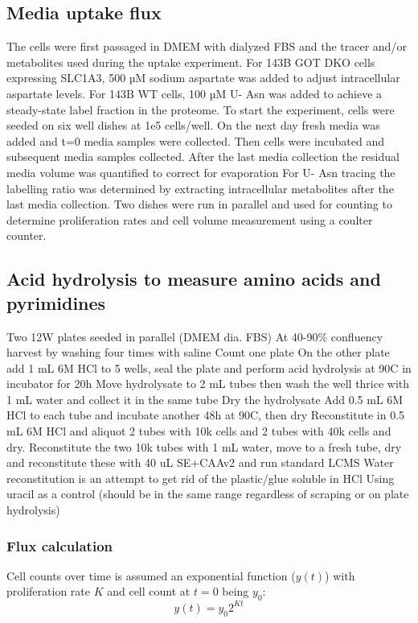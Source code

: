 \subsection{Media uptake flux}
The cells were first passaged in DMEM with dialyzed FBS and the tracer and/or metabolites used during the uptake experiment.
For 143B GOT DKO cells expressing SLC1A3, 500 µM sodium aspartate was added to adjust intracellular aspartate levels.
For 143B WT cells, 100 µM U-\hCi{} Asn was added to achieve a steady-state label fraction in the proteome.
To start the experiment, cells were seeded on six well dishes at 1e5 cells/well.
On the next day fresh media was added and t=0 media samples were collected.
Then cells were incubated and subsequent media samples collected.
After the last media collection the residual media volume was quantified to correct for evaporation
For U-\hCi{} Asn tracing the labelling ratio was determined by extracting intracellular metabolites after the last media collection.
Two dishes were run in parallel and used for counting to determine proliferation rates and cell volume measurement using a coulter counter.

\subsection{Acid hydrolysis to measure amino acids and pyrimidines}
Two 12W plates seeded in parallel (DMEM dia. FBS)
At 40-90\% confluency harvest by washing four times with saline
Count one plate
On the other plate add 1 mL 6M HCl to 5 wells, seal the plate and perform acid hydrolysis at 90C in incubator for 20h
Move hydrolysate to 2 mL tubes then wash the well thrice with 1 mL water and collect it in the same tube
Dry the hydrolysate
Add 0.5 mL 6M HCl to each tube and incubate another 48h at 90C, then dry
Reconstitute in 0.5 mL 6M HCl and aliquot 2 tubes with 10k cells and 2 tubes with 40k cells and dry.
Reconstitute the two 10k tubes with 1 mL water, move to a fresh tube, dry and reconstitute these with 40 uL SE+CAAv2 and run standard LCMS
Water reconstitution is an attempt to get rid of the plastic/glue soluble in HCl
Using uracil as a control (should be in the same range regardless of scraping or on plate hydrolysis)




\subsubsection{Flux calculation}
Cell counts over time is assumed an exponential function ($y(t)$) with proliferation rate $K$ and cell count at $t=0$ being $y_0$:
\begin{equation}
    y(t) = y_0 2^{K t}
\end{equation}

